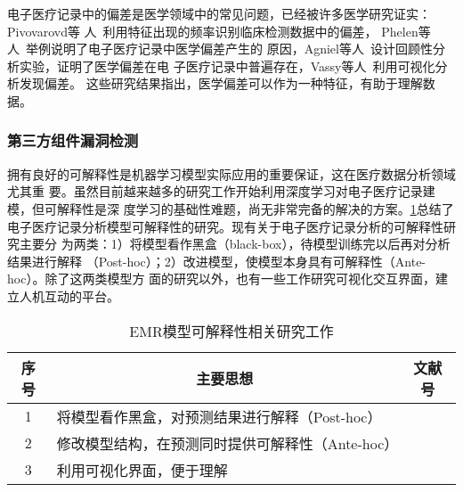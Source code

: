 电子医疗记录中的偏差是医学领域中的常见问题，已经被许多医学研究证实：Pivovarovd等
人~利用特征出现的频率识别临床检测数据中的偏差，
Phelen等人~举例说明了电子医疗记录中医学偏差产生的
原因，Agniel等人~设计回顾性分析实验，证明了医学偏差在电
子医疗记录中普遍存在，Vassy等人~利用可视化分析发现偏差。
这些研究结果指出，医学偏差可以作为一种特征，有助于理解数据。

{}

\subsubsection{第三方组件漏洞检测}

拥有良好的可解释性是机器学习模型实际应用的重要保证，这在医疗数据分析领域尤其重
要。虽然目前越来越多的研究工作开始利用深度学习对电子医疗记录建模，但可解释性是深
度学习的基础性难题，尚无非常完备的解决的方案。\cref{tab:interpretability}总结了
电子医疗记录分析模型可解释性的研究。现有关于电子医疗记录分析的可解释性研究主要分
为两类：1）将模型看作黑盒（black-box），待模型训练完以后再对分析结果进行解释
（Post-hoc）；2）改进模型，使模型本身具有可解释性（Ante-hoc）。除了这两类模型方
面的研究以外，也有一些工作研究可视化交互界面，建立人机互动的平台。

\begin{table}
    \renewcommand\arraystretch{1.5}
    \begin{small}
        \caption{EMR模型可解释性相关研究工作}
        \label{tab:interpretability}
        \begin{center}
            \begin{tabular}[c]{cll}
                \toprule
                \multicolumn{1}{c}{\textbf{序号}} &
                \multicolumn{1}{c}{\textbf{主要思想}} &
                \multicolumn{1}{c}{\textbf{文献号}}\\
                \midrule
                1 & 将模型看作黑盒，对预测结果进行解释（Post-hoc） & \cite{panigutti2019explaining}
                \cite{panigutti2020doctor} \\
                2 & 修改模型结构，在预测同时提供可解释性（Ante-hoc） &
                \cite{choi2016retain} \cite{ma2017dipole} \cite{bai2018interpretable}
                \cite{gao2019camp} \cite{ma2019adacare} \\
                3 & 利用可视化界面，便于理解 & \cite{kwon2018retainvis} \cite{jin2020carepre}
                \cite{guo2020comparative} \\
                \bottomrule
            \end{tabular}
        \end{center}
    \end{small}
\end{table}

